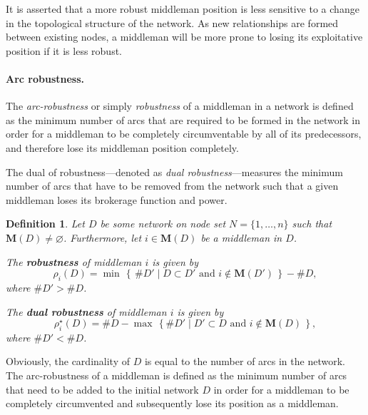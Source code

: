 \documentclass[11pt,fleqn]{article}
\newcounter{llst}
\newenvironment{abet}{\begin{list}{\rm (\alph{llst})}{\usecounter{llst}
\setlength{\itemindent}{0em} \setlength{\leftmargin}{3em}
\setlength{\labelwidth}{2em} \setlength{\labelsep}{1em}}}{\end{list}}
\newtheorem{definition}[theorem]{Definition}
\begin{document}
 It is asserted that a more robust middleman position is less sensitive to a change in the topological structure of the network. As new relationships are formed between existing nodes, a middleman will be more prone to losing its exploitative position if it is less robust.

\paragraph{Arc robustness.}

The \emph{arc-robustness} or simply \emph{robustness} of a middleman in a network is defined as the minimum number of arcs that are required to be formed in the network in order for a middleman to be completely circumventable by all of its predecessors, and therefore lose its middleman position completely.

The dual of robustness---denoted as  \emph{dual robustness}---measures the minimum number of arcs that have to be removed from the network such that a given middleman loses its brokerage function and power.

\begin{definition} \label{robustness}
Let $D$ be some network on node set $N = \{1,\ldots,n\}$ such that $\mathbf{M}(D) \neq \varnothing$. Furthermore, let $i \in \mathbf{M}(D)$ be a middleman in $D$.
\begin{abet}
	\item The \textbf{robustness} of middleman $i$ is given by
	\begin{equation}
		\rho_{i} (D) = \min \, \left\{ \, \# D' \mid D \subset D' \mbox{ and } i \notin \mathbf{M}(D') \, \right\} - \# D ,
	\end{equation}
	where $\# D' > \# D$.
	
	\item The \textbf{dual robustness} of middleman $i$ is given by
	\begin{equation}
		\rho_{i}^{\star} (D) = \# D - \max \, \left\{ \# D' \mid D' \subset D \mbox{ and } i \notin \mathbf{M}(D) \, \right\} ,
	\end{equation}
	where $\# D' < \# D$.
\end{abet}
\end{definition}

\noindent
Obviously, the cardinality of $D$ is equal to the number of arcs in the network. The arc-robustness of a middleman is defined as the minimum number of arcs that need to be added to the initial network $D$ in order for a middleman to be completely circumvented and subsequently lose its position as a middleman.
\end{document}
